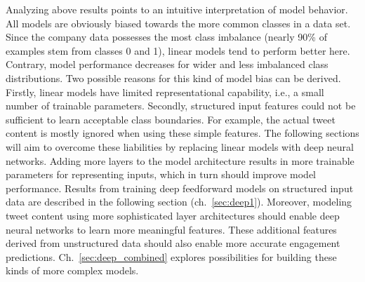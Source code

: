 Analyzing above results points to an intuitive interpretation of model behavior.
All models are obviously biased towards the more common classes in a data set.
Since the company data possesses the most class imbalance (nearly 90\% of examples
stem from classes 0 and 1), linear models tend to perform better here.
Contrary, model performance decreases for wider and less imbalanced class distributions.
Two possible reasons for this kind of model bias can be derived.
Firstly, linear models have limited representational capability, i.e., a small
number of trainable parameters.
Secondly, structured input features could not be sufficient to learn acceptable
class boundaries.
For example, the actual tweet content is mostly ignored when using these simple
features.
The following sections will aim to overcome these liabilities by replacing
linear models with deep neural networks.
Adding more layers to the model architecture results in more trainable parameters
for representing inputs, which in turn should improve
model performance.
Results from training deep feedforward models on structured input data are
described in the following section (ch.~\ref{sec:deep1}).
Moreover, modeling tweet content using more sophisticated layer architectures
should enable deep neural networks to learn more meaningful features.
These additional features derived from unstructured data should also enable
more accurate engagement predictions.
Ch.~\ref{sec:deep_combined} explores possibilities for building these kinds
of more complex models.
